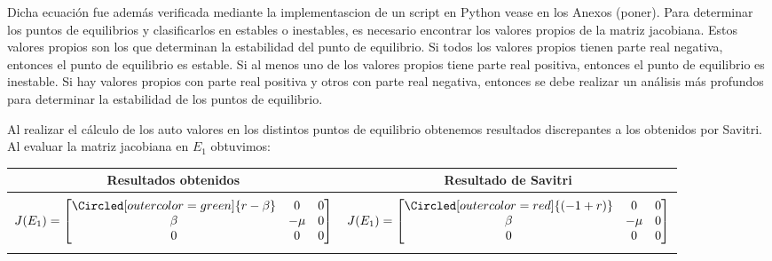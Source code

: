 \documentclass{wscpaperproc}
\theoremstyle{wsc}
\begin{document}
Dicha ecuación fue además verificada mediante la implementascion de un script en Python vease en los Anexos (poner).
Para determinar los puntos de equilibrios y clasificarlos en estables o inestables, es necesario encontrar los valores propios
de la matriz jacobiana. Estos valores propios son los que determinan la estabilidad del punto de equilibrio. Si todos los valores
propios tienen parte real negativa, entonces el punto de equilibrio es estable. Si al menos uno de los valores propios tiene parte real positiva,
entonces el punto de equilibrio es inestable. Si hay valores propios con parte real positiva y otros con parte real negativa,
entonces se debe realizar un análisis más profundos para determinar la estabilidad de los puntos de equilibrio. \par
Al realizar el c\'alculo de los auto valores en los distintos puntos de equilibrio obtenemos resultados discrepantes a los obtenidos por Savitri.
Al evaluar la matriz jacobiana en $E_1$ obtuvimos:
\begin{center}
	\begin{tabular}{ c c }
		\toprule
		\textbf{Resultados obtenidos}                        & \textbf{Resultado de Savitri} \\
		\midrule                                                                             \\
		\addlinespace[-2ex]
		$J(E_1) =\label{Characteristic000t} \begin{bmatrix}
				                                    \Circled[outer color=green]{r-\beta} & 0    & 0 \\
				                                    \beta                                & -\mu & 0 \\
				                                    0                                    & 0    & 0
			                                    \end{bmatrix}$ &
		$J(E_1) =\label{Characteristic000f} \begin{bmatrix}
				                                    \Circled[outer color=red]{(-1+ r) } & 0    & 0 \\
				                                    \beta                               & -\mu & 0 \\
				                                    0                                   & 0    & 0
			                                    \end{bmatrix}$   \\
		\addlinespace[1.5ex]

		\bottomrule
	\end{tabular}
\end{center}
\end{document}
